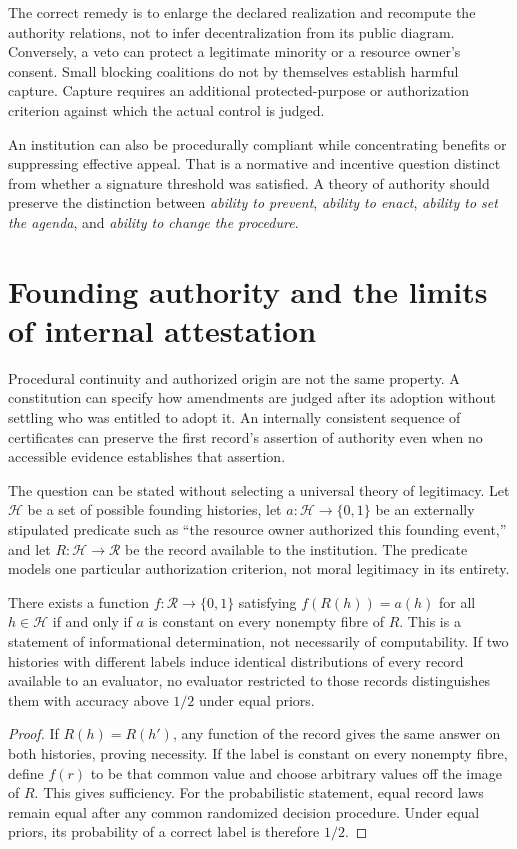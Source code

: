 The correct remedy is to enlarge the declared realization and recompute the authority relations, not to infer decentralization from its public diagram. Conversely, a veto can protect a legitimate minority or a resource owner's consent. Small blocking coalitions do not by themselves establish harmful capture. Capture requires an additional protected-purpose or authorization criterion against which the actual control is judged.

An institution can also be procedurally compliant while concentrating benefits or suppressing effective appeal. That is a normative and incentive question distinct from whether a signature threshold was satisfied. A theory of authority should preserve the distinction between \emph{ability to prevent}, \emph{ability to enact}, \emph{ability to set the agenda}, and \emph{ability to change the procedure}.

\section{Founding authority and the limits of internal attestation}\label{MS:sec:founding}
Procedural continuity and authorized origin are not the same property. A constitution can specify how amendments are judged after its adoption without settling who was entitled to adopt it. An internally consistent sequence of certificates can preserve the first record's assertion of authority even when no accessible evidence establishes that assertion.

The question can be stated without selecting a universal theory of legitimacy. Let $\mathcal H$ be a set of possible founding histories, let $a:\mathcal H\to\{0,1\}$ be an externally stipulated predicate such as ``the resource owner authorized this founding event,'' and let $R:\mathcal H\to\mathcal R$ be the record available to the institution. The predicate models one particular authorization criterion, not moral legitimacy in its entirety.

\begin{MSproposition}\label{MS:prop:founding}
There exists a function $f:\mathcal R\to\{0,1\}$ satisfying $f(R(h))=a(h)$ for all $h\in\mathcal H$ if and only if $a$ is constant on every nonempty fibre of $R$. This is a statement of informational determination, not necessarily of computability. If two histories with different labels induce identical distributions of every record available to an evaluator, no evaluator restricted to those records distinguishes them with accuracy above $1/2$ under equal priors.
\end{MSproposition}
\begin{proof}
If $R(h)=R(h')$, any function of the record gives the same answer on both histories, proving necessity. If the label is constant on every nonempty fibre, define $f(r)$ to be that common value and choose arbitrary values off the image of $R$. This gives sufficiency. For the probabilistic statement, equal record laws remain equal after any common randomized decision procedure. Under equal priors, its probability of a correct label is therefore $1/2$.
\end{proof}

